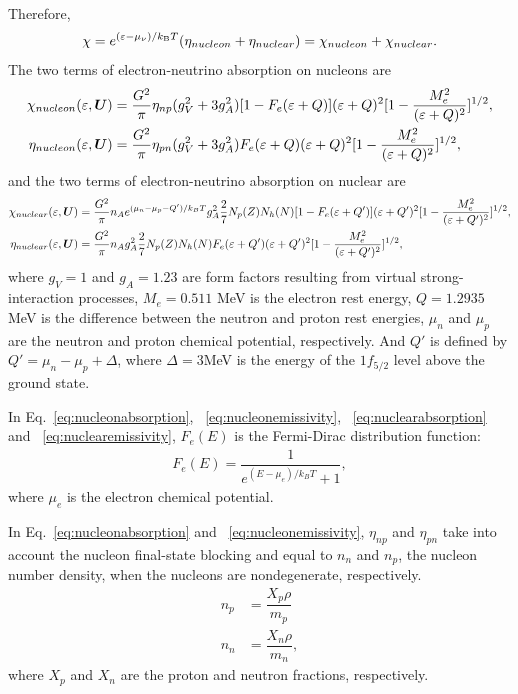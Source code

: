 \documentclass[10pt,preprint]{aastex}
\begin{document}
Therefore,
\begin{equation}
\chi = e^{(\varepsilon-\mu_{\nu})/k_{\mbox{\tiny B}}T} (\eta_{nucleon} + \eta_{nuclear} ) = \chi_{nucleon} + \chi_{nuclear}.
\end{equation}
The two terms of electron-neutrino absorption on nucleons are
 \begin{align}
    \chi_{nucleon}(\varepsilon,\boldsymbol{U}) & = \dfrac{G^2}{\pi} \eta_{np}(g_V^2+3g_A^2)[1-F_e(\varepsilon+Q)](\varepsilon+Q)^2[1-\dfrac{M^2_e}{(\varepsilon+Q)^2}]^{1/2} \label{eq:nucleonabsorption} ,\\
    \eta_{nucleon}(\varepsilon,\boldsymbol{U}) &= \dfrac{G^2}{\pi}\eta_{pn}(g_V^2+3g_A^2)F_e(\varepsilon+Q)(\varepsilon+Q)^2[1-\dfrac{M^2_e}{(\varepsilon+Q)^2}]^{1/2} \label{eq:nucleonemissivity} ,
\end{align}
and the two terms of electron-neutrino absorption on nuclear are
\begin{align}
    \chi_{nuclear}(\varepsilon,\boldsymbol{U}) & = \dfrac{G^2}{\pi} n_A e^{(\mu_n -\mu_p -Q')/k_B T} g^2_A \dfrac{2}{7} N_p(Z) N_h(N)[1-F_e(\varepsilon+Q')](\varepsilon+Q')^2[1-\dfrac{M_e^2}{(\varepsilon+Q')^2}]^{1/2} \label{eq:nuclearabsorption} ,\\
    \eta_{nuclear}(\varepsilon,\boldsymbol{U}) &=\dfrac{G^2}{\pi} n_A g^2_A \dfrac{2}{7} N_p(Z) N_h(N)F_e(\varepsilon+Q')(\varepsilon+Q')^2[1-\dfrac{M_e^2}{(\varepsilon+Q')^2}]^{1/2} \label{eq:nuclearemissivity},
\end{align} 
where $g_V = 1$ and $g_A =1.23$ are form factors resulting from virtual strong-interaction processes, $M_e = 0.511$ MeV is the electron rest energy, $Q = 1.2935$ MeV is the difference between the neutron and proton rest energies, $\mu_n$ and $\mu_p$ are the neutron and proton chemical potential, respectively. And $Q'$ is defined by $Q' = \mu_n -\mu_p + \Delta$, where $\Delta=3$MeV is the energy of the $1f_{5/2}$ level above the ground state.  

In Eq.~\eqref{eq:nucleonabsorption}, ~\eqref{eq:nucleonemissivity}, ~\eqref{eq:nuclearabsorption} and ~\eqref{eq:nuclearemissivity}, $F_e(E)$ is the Fermi-Dirac distribution function:
\begin{align}
F_e(E) = \dfrac{1}{e^{(E-\mu_e)/k_B T} + 1},
\end{align}
where $\mu_e$ is the electron chemical potential.

In Eq.~\eqref{eq:nucleonabsorption} and ~\eqref{eq:nucleonemissivity}, $\eta_{np}$ and $\eta_{pn}$ take into account the nucleon final-state blocking and equal to $n_n$ and $n_p$, the nucleon number density, when the nucleons are nondegenerate, respectively.
\begin{align}
n_p & =  \dfrac{X_p \rho}{m_p} \\
n_n & =  \dfrac{X_n \rho}{m_n},
\end{align}
where $X_p$ and $X_n$ are the proton and neutron fractions, respectively.
\end{document}
